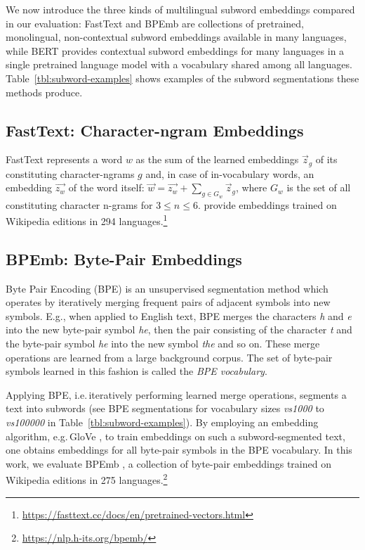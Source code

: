 \documentclass[11pt,a4paper]{article}
\begin{document}
We now introduce the three kinds of multilingual subword embeddings compared in our evaluation: FastText and BPEmb are collections of pretrained, monolingual, non-contextual subword embeddings available in many languages, while BERT provides contextual subword embeddings for many languages in a single pretrained language model with a vocabulary shared among all languages.
Table~\ref{tbl:subword-examples} shows examples of the subword segmentations these methods produce.

\subsection{FastText: Character-ngram Embeddings}

FastText \citep{bojanowski2017subword} represents a word $w$ as the sum of the learned embeddings $\vec{z}_g$ of its constituting character-ngrams $g$ and, in case of in-vocabulary words, an embedding $\vec{z_w}$ of the word itself: $\vec{w} = \vec{z_w} + \sum_{g \in G_w} \vec{z}_g$, where $G_w$ is the set of all constituting character n-grams for $3 \le n \le 6$.
\citeauthor{bojanowski2017subword} provide embeddings trained on Wikipedia editions in 294 languages.\footnote{\url{https://fasttext.cc/docs/en/pretrained-vectors.html}}

\subsection{BPEmb: Byte-Pair Embeddings}
Byte Pair Encoding (BPE) is an unsupervised segmentation method which operates by iteratively merging frequent pairs of adjacent symbols into new symbols.
E.g., when applied to English text, BPE merges the characters \emph{h} and \emph{e} into the new byte-pair symbol \emph{he}, then the pair consisting of the character \emph{t} and the byte-pair symbol \emph{he} into the new symbol \emph{the} and so on.
These merge operations are learned from a large background corpus.
The set of byte-pair symbols learned in this fashion is called the \emph{BPE vocabulary}.

Applying BPE, i.e.\,iteratively performing learned merge operations, segments a text into subwords (see BPE segmentations for vocabulary sizes \emph{vs1000} to \emph{vs100000} in Table~\ref{tbl:subword-examples}).
By employing an embedding algorithm, e.g.\,GloVe \citep{pennington2014glove}, to train embeddings on such a subword-segmented text, one obtains embeddings for all byte-pair symbols in the BPE vocabulary.
In this work, we evaluate BPEmb \citep{heinzerling2018bpemb}, a collection of byte-pair embeddings trained on Wikipedia editions in 275 languages.\footnote{\url{https://nlp.h-its.org/bpemb/}}
\end{document}
